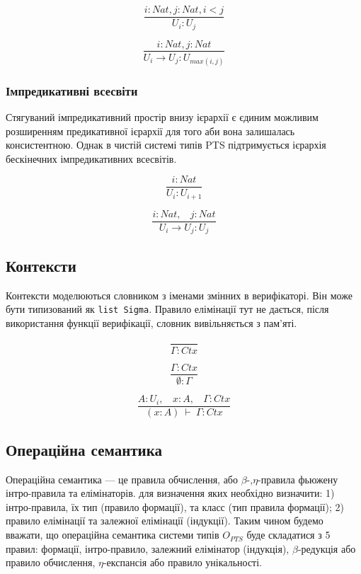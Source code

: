 \[
\tag{$A_1$}
\dfrac{i: Nat, j: Nat, i < j}{U_i : U_j}
\]

\[
\tag{$R_1$}
\dfrac{i : Nat, j : Nat}{U_i \rightarrow U_j : U_{max(i,j)} }
\]

\subsubsection*{Імпредикативні всесвіти}
Стягуваний імпредикативний простір внизу ієрархії є єдиним можливим розширенням
предикативної ієрархії для того аби вона залишалась консистентною. Однак
в чистій системі типів PTS підтримується ієрархія бескінечних імпредикативних всесвітів.

\begin{equation}
\tag{$A_2$}
\dfrac
{i: Nat}
{U_i : U_{i+1}}
\end{equation}

\begin{equation}
\tag{$R_2$}
\dfrac
{i : Nat,\ \ \ \ j : Nat}
{U_i \rightarrow U_{j} : U_{j}}
\end{equation}

\subsection*{Контексти}

Контексти моделюються словником з іменами змінних в верифікаторі.
Він може бути типизований як \lstinline{list Sigma}.
Правило елімінації тут не дається, після використання функції верифікації,
словник вивільняється з пам'яті.

\begin{equation}
\tag{Ctx-formation}
\dfrac
{}
{\Gamma : Ctx}
\end{equation}

\begin{equation}
\tag{Ctx-intro$_1$}
\dfrac
{\Gamma : Ctx}
{\emptyset : \Gamma}
\end{equation}

\begin{equation}
\tag{Ctx-intro$_2$}
\dfrac
{A : U_i,\ \ \ \ x : A,\ \ \ \ \Gamma : Ctx}
{(x : A)\ \vdash\ \Gamma : Ctx}
\end{equation}

\subsection{Операційна семантика}
Операційна семантика --- це правила обчислення,
або $\beta$-,$\eta$-правила фьюжену інтро-правила та елімінаторів.
для визначення яких необхідно визначити:
1) інтро-правила, їх тип (правило формації), та класс (тип правила формації);
2) правило елімінації та залежної елімінації (індукції).
Таким чином будемо вважати, що операційна семантика системи типів $O_{PTS}$
буде складатися з 5 правил: формації, інтро-правило,
залежний елімінатор (індукція), $\beta$-редукція або правило обчислення,
$\eta$-експансія або правило унікальності.

